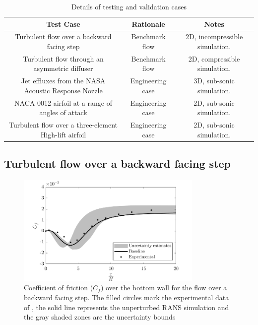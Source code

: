\begin{table}
\caption{\label{tab:vandv_cases} Details of testing and validation cases}
\begin{center}
\begin{tabular}{ccc}
Test Case& Rationale& Notes \\\hline
Turbulent flow over a backward facing step& Benchmark flow& 2D, incompressible simulation.\\
Turbulent flow through an asymmetric diffuser& Benchmark flow& 2D, compressible simulation.\\
Jet effluxes from the NASA Acoustic Response Nozzle& Engineering case & 3D, sub-sonic simulation.\\
NACA 0012 airfoil at a range of angles of attack& Engineering case& 2D, sub-sonic simulation.\\
Turbulent flow over a three-element High-lift airfoil& Engineering case& 2D, sub-sonic simulation.\\
\end{tabular}
\end{center}
\end{table}

\subsection{Turbulent flow over a backward facing step}



\begin{figure}
\centering
\includegraphics[width=0.8\textwidth]{code/image_gen/backstep/images/backstep_cf_bot.png}
\caption{Coefficient of friction ($C_f$) over the bottom wall for the flow over a backward facing step. The filled circles mark the experimental data of \cite{driver1985}, the solid line represents the unperturbed RANS simulation and the gray shaded zones are the uncertainty bounds\label{fig:backstep_cf}}
\end{figure}

